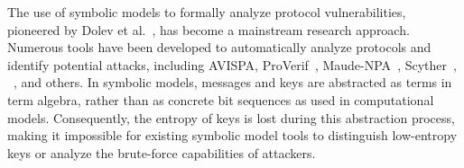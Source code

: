 \documentclass[../main.tex]{subfiles}  %
\begin{document}

The use of symbolic models to formally analyze protocol vulnerabilities, pioneered by Dolev et al.~\cite{dolev1983security}, has become a mainstream research approach.
Numerous tools have been developed to automatically analyze protocols and identify potential attacks, including AVISPA\cite{armando2005avispa}, ProVerif~\cite{blanchet2018proverif}, Maude-NPA~\cite{escobar2007maude}, Scyther~\cite{cremers2008scyther}, \Tamarin{}~\cite{meier2013tamarin}, and others.
In symbolic models, messages and keys are abstracted as terms in term algebra, rather than as concrete bit sequences as used in computational models. 
Consequently, the entropy of keys is lost during this abstraction process, making it impossible for existing symbolic model tools to distinguish low-entropy keys or analyze the brute-force capabilities of attackers.
\end{document}

